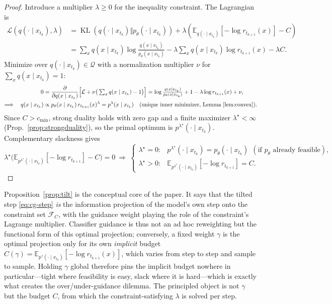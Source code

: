 \documentclass{article}
\DeclareMathOperator{\KL}{KL}
\newcommand{\E}{\mathbb{E}}
\newcommand{\Q}{\mathcal{Q}}
\newcommand{\lstar}{\lambda^{\star}}
\begin{document}
\begin{proof}
Introduce a multiplier $\lambda\ge 0$ for the inequality constraint. The Lagrangian is
\begin{equation}
\label{eq:lagrangian}
\begin{aligned}
\mathcal{L}(q(\cdot\mid x_{t_k}),\lambda)
&=\KL(q(\cdot\mid x_{t_k})\Vert p_\theta(\cdot\mid x_{t_k}))+\lambda\!\left(\E_{q(\cdot\mid x_{t_k})}[-\log r_{t_{k+1}}(x)]-C\right)\\
&=\sum_x q(x\mid x_{t_k})\log\frac{q(x\mid x_{t_k})}{p_\theta(x\mid x_{t_k})}
-\lambda\sum_x q(x\mid x_{t_k})\log r_{t_{k+1}}(x)-\lambda C.
\end{aligned}
\end{equation}
Minimize over $q(\cdot\mid x_{t_k})\in\Q$ with a normalization multiplier $\nu$ for $\sum_x q(x\mid x_{t_k})=1$:
\begin{align*}
0&=\frac{\partial}{\partial q(x\mid x_{t_k})}\Big[\mathcal L+\nu\big(\textstyle\sum_x q(x\mid x_{t_k})-1\big)\Big]
  =\log\frac{q(x\mid x_{t_k})}{p_\theta(x\mid x_{t_k})}+1-\lambda\log r_{t_{k+1}}(x)+\nu,\\
\Longrightarrow\quad q(x\mid x_{t_k})&\propto p_\theta(x\mid x_{t_k})\,r_{t_{k+1}}(x)^{\lambda}=p^{\lambda}(x\mid x_{t_k})
  \quad\text{(unique inner minimizer, Lemma~\ref{lem:convex})}.
\end{align*}
Since $C>c_{\min}$, strong duality holds with zero gap and a finite maximizer $\lstar<\infty$ (Prop.~\ref{prop:strongduality}), so the primal optimum is $p^{\lstar}(\cdot\mid x_{t_k})$. Complementary slackness gives
\begin{equation*}
\lstar\big(\E_{p^{\lstar}(\cdot\mid x_{t_k})}[-\log r_{t_{k+1}}]-C\big)=0
\ \Longrightarrow\
\begin{cases}
\lstar=0: & p^{\lstar}(\cdot\mid x_{t_k})=p_\theta(\cdot\mid x_{t_k})\ \ (\text{if }p_\theta\text{ already feasible}),\\[2pt]
\lstar>0: & \E_{p^{\lstar}(\cdot\mid x_{t_k})}[-\log r_{t_{k+1}}]=C.
\end{cases}
\end{equation*}
\end{proof}

Proposition~\ref{prop:tilt} is the conceptual core of the paper. It says that the tilted step \eqref{eq:cg-step} \emph{is} the information projection of the model's own step onto the constraint set $\mathcal F_C$, with the guidance weight playing the role of the constraint's Lagrange multiplier. Classifier guidance is thus not an ad hoc reweighting but the functional form of this optimal projection; conversely, a fixed weight $\gamma$ is the optimal projection only for its own \emph{implicit} budget $C(\gamma)=\E_{p^{\gamma}(\cdot\mid x_{t_k})}[-\log r_{t_{k+1}}(x)]$, which varies from step to step and sample to sample. Holding $\gamma$ global therefore pins the implicit budget nowhere in particular---tight where feasibility is easy, slack where it is hard---which is exactly what creates the over/under-guidance dilemma. The principled object is not $\gamma$ but the budget $C$, from which the constraint-satisfying $\lambda$ is solved per step.
\end{document}
